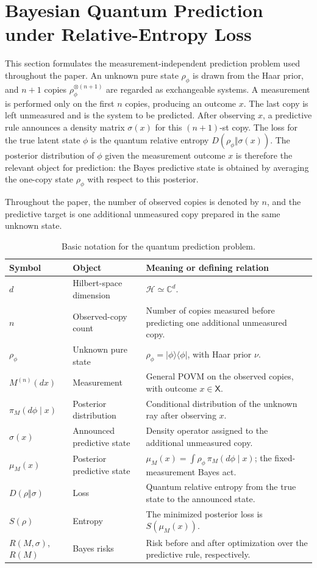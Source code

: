 \documentclass[journal]{IEEEtran}
\newcommand{\ket}[1]{\lvert #1\rangle}
\newcommand{\bra}[1]{\langle #1\rvert}
\begin{document}
\section{Bayesian Quantum Prediction under Relative-Entropy Loss}
\label{sec:general_decision}
This section formulates the measurement-independent prediction problem used
throughout the paper.  An unknown pure state \(\rho_\phi\) is drawn from the Haar
prior, and \(n+1\) copies \(\rho_\phi^{\otimes(n+1)}\) are regarded as
exchangeable systems.  A measurement is performed only on the first \(n\) copies,
producing an outcome \(x\).  The last copy is left unmeasured and is the system
to be predicted.  After observing \(x\), a predictive rule announces a density
matrix \(\sigma(x)\) for this \((n+1)\)-st copy.  The loss for the true latent
state \(\phi\) is the quantum relative entropy \(D(\rho_\phi\Vert\sigma(x))\).
The posterior distribution of \(\phi\) given the measurement outcome \(x\) is
therefore the relevant object for prediction: the Bayes predictive state is
obtained by averaging the one-copy state \(\rho_\phi\) with respect to this
posterior.

Throughout the paper, the number of observed copies is denoted by \(n\),
and the predictive target is one additional unmeasured copy prepared in the
same unknown state.

\begin{table}[t]
\centering
\caption{Basic notation for the quantum prediction problem.}
\label{tab:basic_prediction_notation}
\small
\renewcommand{\arraystretch}{1.08}
\begin{tabular}{p{}p{}p{}}
\toprule
Symbol & Object & Meaning or defining relation \\
\midrule
\(d\) & Hilbert-space dimension & \(\mathcal H\simeq\mathbb C^d\). \\
\(n\) & Observed-copy count & Number of copies measured before predicting one additional unmeasured copy. \\
\(\rho_\phi\) & Unknown pure state & \(\rho_\phi=\ket\phi\bra\phi\), with Haar prior \(\nu\). \\
\(M^{(n)}(dx)\) & Measurement & General POVM on the observed copies, with outcome \(x\in\mathsf X\). \\
\(\pi_M(d\phi\mid x)\) & Posterior distribution & Conditional distribution of the unknown ray after observing \(x\). \\
\(\sigma(x)\) & Announced predictive state & Density operator assigned to the additional unmeasured copy. \\
\(\mu_M(x)\) & Posterior predictive state & \(\mu_M(x)=\int\rho_\phi\,\pi_M(d\phi\mid x)\); the fixed-measurement Bayes act. \\
\(D(\rho\Vert\sigma)\) & Loss & Quantum relative entropy from the true state to the announced state. \\
\(S(\rho)\) & Entropy & The minimized posterior loss is \(S(\mu_M(x))\). \\
\(R(M,\sigma)\), \(R(M)\) & Bayes risks & Risk before and after optimization over the predictive rule, respectively. \\
\bottomrule
\end{tabular}
\end{table}
\end{document}
